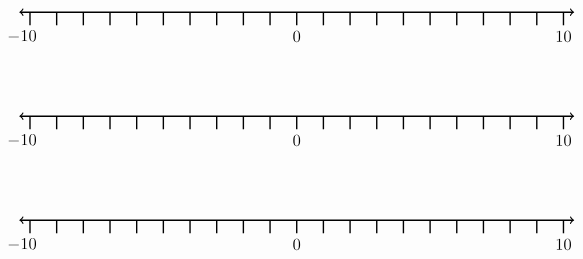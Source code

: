 \documentclass[leqno, 12pt]{article}
\begin{document}
\vspace{10pt}\begin{equation}
    \begin{tikzpicture}[scale=0.67, baseline={([yshift=-1pt]current bounding box.north)}]
        \draw[{To[scale=1.3]}-{To[scale=1.3]}, line width=1pt] (-10.4, 0) -- (10.4, 0);
        \foreach \x in {-10,-9,...,10}
            \draw[shift={(\x,0)},color=black, line width=1pt] (0pt,-14pt) -- (0pt,0pt);
        \foreach \x in {-10}
            \draw[shift={(\x -0.3,-0.8)},color=black] node[font=\large,text height=12pt] {$\x$};
        \foreach \x in {0,10}
            \draw[shift={(\x,-0.8)},color=black] node[font=\large,text height=12pt] {$\x$};
        \node [font=\large, anchor=east] at (15,1.65){$  $};
    \end{tikzpicture}
\end{equation}
\vspace{10pt}\begin{equation}
    \begin{tikzpicture}[scale=0.67, baseline={([yshift=-1pt]current bounding box.north)}]
        \draw[{To[scale=1.3]}-{To[scale=1.3]}, line width=1pt] (-10.4, 0) -- (10.4, 0);
        \foreach \x in {-10,-9,...,10}
            \draw[shift={(\x,0)},color=black, line width=1pt] (0pt,-14pt) -- (0pt,0pt);
        \foreach \x in {-10}
            \draw[shift={(\x -0.3,-0.8)},color=black] node[font=\large,text height=12pt] {$\x$};
        \foreach \x in {0,10}
            \draw[shift={(\x,-0.8)},color=black] node[font=\large,text height=12pt] {$\x$};
        \node [font=\large, anchor=east] at (15,1.65){$  $};
    \end{tikzpicture}
\end{equation}
\vspace{10pt}\begin{equation}
    \begin{tikzpicture}[scale=0.67, baseline={([yshift=-1pt]current bounding box.north)}]
        \draw[{To[scale=1.3]}-{To[scale=1.3]}, line width=1pt] (-10.4, 0) -- (10.4, 0);
        \foreach \x in {-10,-9,...,10}
            \draw[shift={(\x,0)},color=black, line width=1pt] (0pt,-14pt) -- (0pt,0pt);
        \foreach \x in {-10}
            \draw[shift={(\x -0.3,-0.8)},color=black] node[font=\large,text height=12pt] {$\x$};
        \foreach \x in {0,10}
            \draw[shift={(\x,-0.8)},color=black] node[font=\large,text height=12pt] {$\x$};
        \node [font=\large, anchor=east] at (15,1.65){$  $};
    \end{tikzpicture}
\end{equation}
\end{document}
